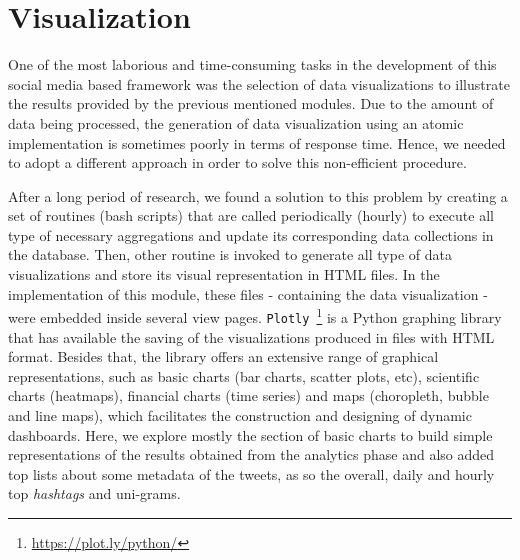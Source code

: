 \section{Visualization}\label{sec:visualization}

One of the most laborious and time-consuming tasks in the development of this social media based framework was the selection of data visualizations to illustrate the results provided by the previous mentioned modules. Due to the amount of data being processed, the generation of data visualization using an atomic implementation is sometimes poorly in terms of response time. Hence, we needed to adopt a different approach in order to solve this non-efficient procedure.

After a long period of research, we found a solution to this problem by creating a set of routines (bash scripts) that are called periodically (hourly) to execute all type of necessary aggregations and update its corresponding data collections in the database. Then, other routine is invoked to generate all type of data visualizations and store its visual representation in HTML files. In the implementation of this module, these files - containing the data visualization - were embedded inside several view pages. \texttt{Plotly}~\footnote{\url{https://plot.ly/python/}} is a Python graphing library that has available the saving of the visualizations produced in files with HTML format. Besides that, the library offers an extensive range of graphical representations, such as basic charts (bar charts, scatter plots, etc), scientific charts (heatmaps), financial charts (time series) and maps (choropleth, bubble and line maps), which facilitates the construction and designing of dynamic dashboards. Here, we explore mostly the section of basic charts to build simple representations of the results obtained from the analytics phase and also added top lists about some metadata of the tweets, as so the overall, daily and hourly top \textit{hashtags} and uni-grams.

